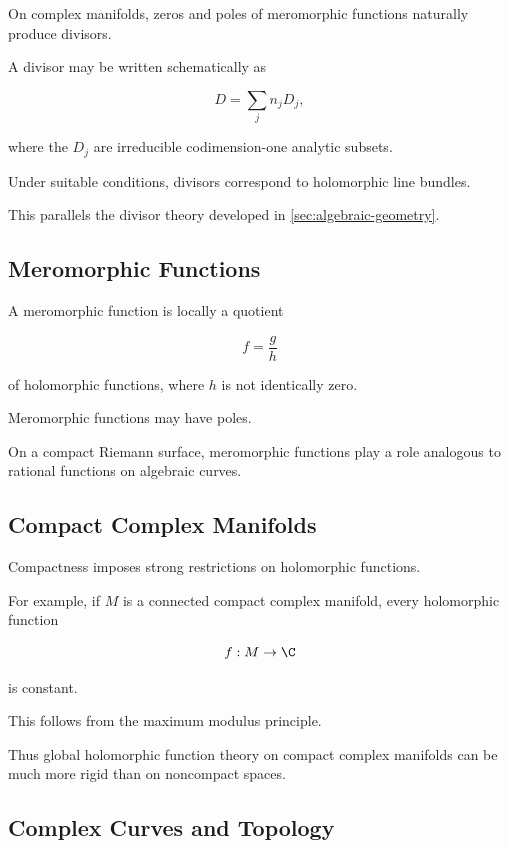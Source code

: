 On complex manifolds, zeros and poles of meromorphic functions naturally
produce divisors.

A divisor may be written schematically as

\[
\boxed{
D=\sum_j n_jD_j,
}
\]

where the \(D_j\) are irreducible codimension-one analytic subsets.

Under suitable conditions, divisors correspond to holomorphic line bundles.

This parallels the divisor theory developed in
\cref{sec:algebraic-geometry}.

\subsection{Meromorphic Functions}
\label{subsec:complex-meromorphic-functions}

A meromorphic function is locally a quotient

\[
\boxed{
f=\frac{g}{h}
}
\]

of holomorphic functions, where \(h\) is not identically zero.

Meromorphic functions may have poles.

On a compact Riemann surface, meromorphic functions play a role analogous to
rational functions on algebraic curves.

\subsection{Compact Complex Manifolds}
\label{subsec:compact-complex-manifolds}

Compactness imposes strong restrictions on holomorphic functions.

For example, if \(M\) is a connected compact complex manifold, every
holomorphic function

\[
f:M\to\C
\]

is constant.

This follows from the maximum modulus principle.

Thus global holomorphic function theory on compact complex manifolds can be
much more rigid than on noncompact spaces.

\subsection{Complex Curves and Topology}
\label{subsec:complex-curves-topology}

